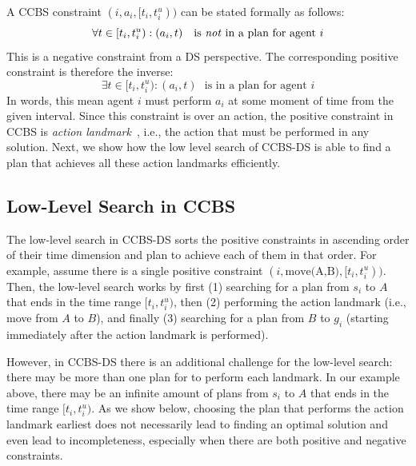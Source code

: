 \documentclass[letterpaper]{article} %
\newcommand{\ccbs}{\ac{CCBS}\xspace}
\newcommand{\ccbsds}{\ac{CCBS-DS}\xspace}
\newcommand{\ds}{\ac{DS}\xspace}
\begin{document}
A \ccbs constraint $(i, a_i, [t_i, t_i^u))$ can be stated formally as follows:
\[
\forall t\in [t_i, t_i^u): (a_i, t) ~~~ \text{is \emph{not} in a plan for agent $i$}
\]
This is a negative constraint from a \ds perspective.
The corresponding positive constraint is therefore the inverse: %
\[
\exists t\in [t_i, t_i^u): (a_i, t) ~~~ \text{is in a plan for agent $i$}
\]
In words, this mean agent $i$ must perform $a_i$ at some moment of time from the given interval. 
Since this constraint is over an action, the positive constraint in \ccbs is \emph{action landmark}~\cite{karpas2009cost}, 
i.e., the action that must be performed in any solution. Next, we show how the low level search of \ccbsds is able to find a plan that achieves all these action landmarks efficiently. 

\subsection{Low-Level Search in \ccbs}

The low-level search in \ccbsds sorts the positive constraints in ascending order of their time dimension and plan to achieve each of them in that order. 
For example, assume there is a single positive constraint $(i, \text{move(A,B)}, [t_i, t_i^u))$.  
Then, the low-level search works by first 
(1) searching for a plan from $s_i$ to $A$ that ends in the time range $[t_i, t_i^u)$, 
then (2) performing the action landmark (i.e., move from $A$ to $B$),
and finally (3) searching for a plan from $B$ to $g_i$ (starting immediately after the action landmark is performed). 


However, in \ccbsds there is an additional challenge for the low-level search: there may be more than one plan for to perform each landmark. 
In our example above, there may be an infinite amount of plans from $s_i$ to $A$  that ends in the time range $[t_i, t_i^u)$. 
As we show below, choosing the plan that performs the action landmark earliest does not necessarily lead to finding an optimal solution and even lead to incompleteness, especially when there are both positive and negative constraints. 
\end{document}
